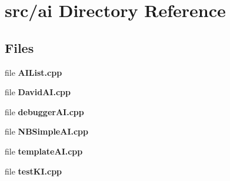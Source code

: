 \section{src/ai Directory Reference}
\label{dir_128a93aeeff33a8423f079f46929dbb3}
\subsection*{Files}
\begin{DoxyCompactItemize}
\item 
file {\bfseries A\-I\-List.\-cpp}
\item 
file {\bfseries David\-A\-I.\-cpp}
\item 
file {\bfseries debugger\-A\-I.\-cpp}
\item 
file {\bfseries N\-B\-Simple\-A\-I.\-cpp}
\item 
file {\bfseries template\-A\-I.\-cpp}
\item 
file {\bfseries test\-K\-I.\-cpp}
\end{DoxyCompactItemize}
